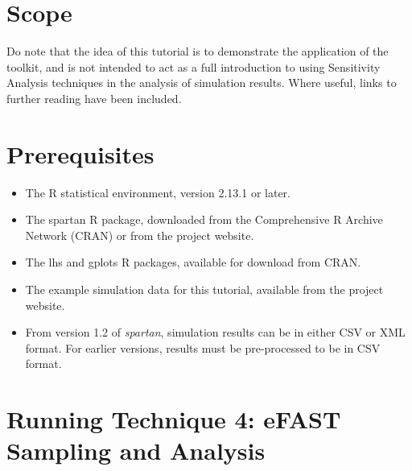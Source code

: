 \documentclass[a4paper,11pt]{article}
\begin{document}
\section{Scope}
\noindent Do note that the idea of this tutorial is to demonstrate the application of the toolkit, and is not intended to act as a full introduction to using Sensitivity Analysis techniques in the analysis of simulation results. Where useful, links to further reading have been included.

\section{Prerequisites}
\begin{itemize}
\item The R statistical environment, version 2.13.1 or later.
\item The spartan R package, downloaded from the Comprehensive R Archive Network (CRAN) or from the project website.
\item The lhs and gplots R packages, available for download from CRAN.
\item The example simulation data for this tutorial, available from the project website.
\item From version 1.2 of \textit{spartan}, simulation results can be in either CSV or XML format. For earlier versions, results must be pre-processed to be in CSV format.
\end{itemize}

\section{Running Technique 4: eFAST Sampling and Analysis}
\end{document}
